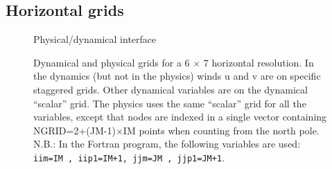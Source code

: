 \subsection{Horizontal grids}

 \begin{figure}
\begin{center}
\centerline{}
\caption{Physical/dynamical interface}
\label{fg:fidyn}
\end{center}
\end{figure}

\begin{figure}
\centerline{}
\caption{Dynamical and physical grids for a 6 $\times$ 7 horizontal resolution.
In the dynamics (but not in the physics) winds u and v are on specific
staggered grids. Other dynamical variables are on the dynamical ``scalar'' grid.
The physics uses the same ``scalar'' grid for all the variables,
except that nodes are indexed in a single vector containing
NGRID=2+(JM-1)$\times$IM points when counting from the north pole.
N.B.: In the Fortran program, the following variables are used:
 {\tt iim=IM , iip1=IM+1, jjm=JM , jjp1=JM+1}.\label{fg:grid}}
\end{figure}


